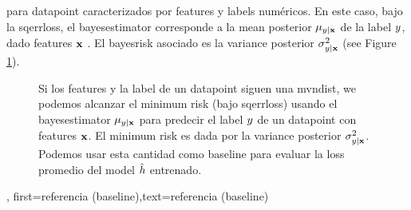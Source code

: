 {{para \gls{datapoint} caracterizados por \gls{feature}s y \gls{label}s numéricos.
En este caso, bajo la \gls{sqerrloss}, el \gls{bayesestimator} corresponde a la \gls{mean} posterior
$\mu_{y|{\bf x}}$ de la \gls{label} $y$, dado  
\gls{feature}s ${\bf x}$ \cite{LC,GrayProbBook}. El \gls{bayesrisk} asociado es la 
\gls{variance} posterior
$\sigma^{2}_{y|{\bf x}}$ (see Figure \ref{fig_post_baseline_dict}).
	\begin{figure}[H]
		\begin{center}
		\end{center}
		\caption{Si los \gls{feature}s y la  \gls{label} de un \gls{datapoint} siguen una \gls{mvndist}, we 
		podemos alcanzar el \gls{minimum} \gls{risk} (bajo \gls{sqerrloss}) usando el \gls{bayesestimator} $\mu_{y|{\bf x}}$ 
		para predecir el \gls{label} $y$ de un \gls{datapoint} con \gls{feature}s ${\bf x}$. El
		\gls{minimum} \gls{risk} es dada por la \gls{variance} posterior $\sigma^{2}_{y|{\bf x}}$. Podemos 
		usar esta cantidad como baseline para evaluar la \gls{loss} promedio del \gls{model} $\hat{h}$ entrenado. \label{fig_post_baseline_dict}}
	\end{figure}},
    first={referencia (baseline)},text={referencia (baseline)}
}


